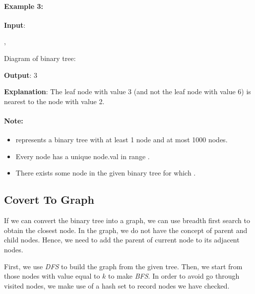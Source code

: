 \paragraph{Example 3:}
\begin{flushleft}

\textbf{Input}:

, 

Diagram of binary tree:

\begin{figure}[H]
\end{figure}

\textbf{Output}: 3

\textbf{Explanation}: The leaf node with value 3 (and not the leaf node with value 6) is nearest to the node with value 2.
\end{flushleft}

\paragraph{Note:}

\begin{itemize}
\item {} represents a binary tree with at least 1 node and at most 1000 nodes.
\item Every node has a unique node.val in range \fcj{[1, 1000]}.
\item There exists some node in the given binary tree for which .
\end{itemize}

\subsection{Covert To Graph}
If we can convert the binary tree into a graph, we can use breadth first search to obtain the closest node. In the graph, we do not have the concept of parent and child nodes. Hence, we need to add the parent of current node to its adjacent nodes.

First, we use \textit{DFS} to build the graph from the given tree. Then, we start from those nodes with value equal to $k$ to make \textit{BFS}. In order to avoid go through visited nodes, we make use of a hash set to record nodes we have checked.


